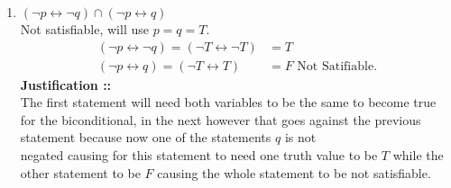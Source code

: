 \documentclass[11pt]{article}
\begin{document}
\begin{enumerate}[label=6.\arabic* ::]
\item
$(\neg p\leftrightarrow\neg q)\cap(\neg p\leftrightarrow q)$ \\
Not satisfiable, will use $p = q = T$.
\begin{align}
    (\neg p\leftrightarrow\neg q) = (\neg T\leftrightarrow\neg T) &= T \\
    (\neg p\leftrightarrow q) = (\neg T\leftrightarrow T) &= F \text{ Not Satifiable.}
\end{align}
\textbf{Justification ::} \\
The first statement will need both variables to be the same to become true for the
biconditional, in the next however that goes against the previous statement because now
one of the statements $q$ is not \\negated causing for this statement to need one truth
value to be $T$ while the other statement to be $F$ causing the whole statement to be not
satisfiable.
\end{enumerate}
\end{document}
